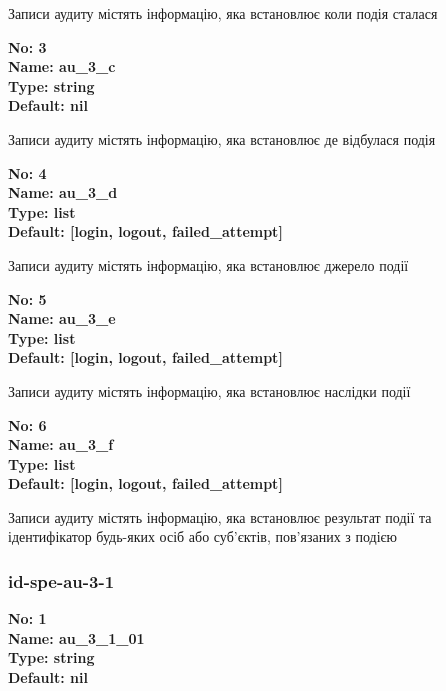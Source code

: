 \documentclass{article}
\begin{document}
{\footnotesize Записи аудиту містять інформацію, яка встановлює коли подія сталася}


{\footnotesize\bfseries
No: 3\\
Name: au\_\allowbreak{}3\_\allowbreak{}c\\
Type: string\\
Default: nil
}

{\footnotesize Записи аудиту містять інформацію, яка встановлює де відбулася подія}


{\footnotesize\bfseries
No: 4\\
Name: au\_\allowbreak{}3\_\allowbreak{}d\\
Type: list\\
Default: [\textquotedbl{}login\textquotedbl{}, \textquotedbl{}logout\textquotedbl{}, \textquotedbl{}failed\_\allowbreak{}attempt\textquotedbl{}]
}

{\footnotesize Записи аудиту містять інформацію, яка встановлює джерело події}


{\footnotesize\bfseries
No: 5\\
Name: au\_\allowbreak{}3\_\allowbreak{}e\\
Type: list\\
Default: [\textquotedbl{}login\textquotedbl{}, \textquotedbl{}logout\textquotedbl{}, \textquotedbl{}failed\_\allowbreak{}attempt\textquotedbl{}]
}

{\footnotesize Записи аудиту містять інформацію, яка встановлює наслідки події}


{\footnotesize\bfseries
No: 6\\
Name: au\_\allowbreak{}3\_\allowbreak{}f\\
Type: list\\
Default: [\textquotedbl{}login\textquotedbl{}, \textquotedbl{}logout\textquotedbl{}, \textquotedbl{}failed\_\allowbreak{}attempt\textquotedbl{}]
}

{\footnotesize Записи аудиту містять інформацію, яка встановлює результат події та ідентифікатор будь-яких осіб або суб'єктів, пов'язаних з подією}




\subsubsection{id-spe-au-3-1}


\vspace{10pt}
{\footnotesize\bfseries
No: 1\\
Name: au\_\allowbreak{}3\_\allowbreak{}1\_\allowbreak{}01\\
Type: string\\
Default: nil
}
\end{document}
